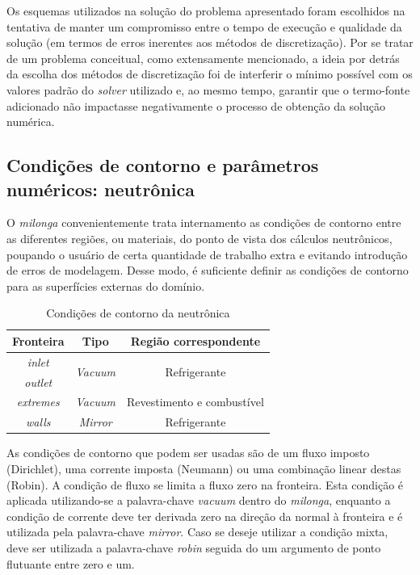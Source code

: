 Os esquemas utilizados na solução do problema apresentado foram escolhidos na tentativa de manter
um compromisso entre o tempo de execução e qualidade da solução (em termos de erros inerentes
aos métodos de discretização). Por se tratar de um problema conceitual, como extensamente mencionado,
a ideia por detrás da escolha dos métodos de discretização foi de interferir o mínimo possível com
os valores padrão do \textit{solver} utilizado e, ao mesmo tempo, garantir que o termo-fonte
adicionado não impactasse negativamente o processo de obtenção da solução numérica.


\subsection{Condições de contorno e parâmetros numéricos: neutrônica}
\label{ssec:neutro}

O \textit{milonga} convenientemente trata internamento as condições de contorno
entre as diferentes regiões, ou materiais, do ponto de vista dos cálculos neutrônicos,
poupando o usuário de certa quantidade de trabalho extra e evitando introdução
de erros de modelagem. Desse modo, é suficiente definir as condições de contorno
para as superfícies externas do domínio.

\begin{table}[htb]
  \centering
\caption{Condições de contorno da neutrônica}
\label{tab:cc-neut}
\begin{tabular}{ccc}
Fronteira         & Tipo                             & Região correspondente         \\ \hline
\textit{inlet}    & \multirow{2}{*}{\textit{Vacuum}} & \multirow{2}{*}{Refrigerante} \\
\textit{outlet}   &                                  &                               \\ \cline{1-1}
\textit{extremes} & \textit{Vacuum}                  & Revestimento e combustível    \\ \hline
\textit{walls}    & \textit{Mirror}                  & Refrigerante                 
\end{tabular}
\end{table}

As condições de contorno que podem ser usadas são de um fluxo imposto (Dirichlet),
uma corrente imposta (Neumann) ou uma combinação linear destas (Robin). A condição de
fluxo se limita a fluxo zero na fronteira. Esta condição é aplicada utilizando-se
a palavra-chave \textit{vacuum} dentro do \textit{milonga}, enquanto a condição
de corrente deve ter derivada zero na direção da normal à fronteira e é utilizada
pela palavra-chave \textit{mirror}. Caso se deseje utilizar a condição mixta, deve
ser utilizada a palavra-chave \textit{robin} seguida do um argumento de ponto
flutuante entre zero e um.


